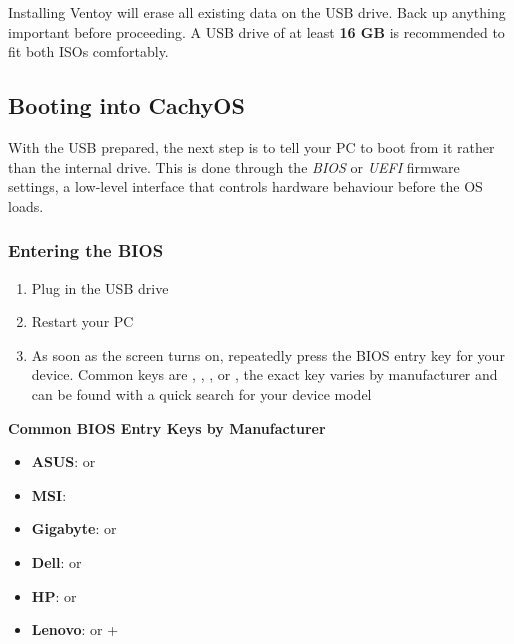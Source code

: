 \documentclass{article}
\begin{document}
\begin{tcolorbox}[arc=12pt, outer arc=10pt,
  colback=red!5!white, colframe=red!60!black,
  title=\textbf{Warning}]
  Installing Ventoy will erase all existing data on the USB drive. Back up anything important before proceeding. A USB drive of at least \textbf{16 GB} is recommended
  to fit both ISOs comfortably.
\end{tcolorbox}

\subsection{Booting into CachyOS}

With the USB prepared, the next step is to tell your PC to boot from it rather than the internal drive. This is done through the \textit{BIOS} or \textit{UEFI} firmware
settings, a low-level interface that controls hardware behaviour before the OS loads.

\subsubsection{Entering the BIOS}

\begin{enumerate}[leftmargin=1.5em, nosep, label={\arabic*.}]
  \item Plug in the USB drive
  \item Restart your PC
  \item As soon as the screen turns on, repeatedly press the BIOS entry key for your
    device. Common keys are , , , or , the exact key varies by manufacturer and can be found with a quick search for your device model
\end{enumerate}

\begin{callout}{\textbf{Common BIOS Entry Keys by Manufacturer}}
  \begin{itemize}[leftmargin=1.5em, nosep, label={\tiny\textbullet}]
    \item \textbf{ASUS}:  or 
    \item \textbf{MSI}: 
    \item \textbf{Gigabyte}:  or 
    \item \textbf{Dell}:  or 
    \item \textbf{HP}:  or 
    \item \textbf{Lenovo}:  or  + 
  \end{itemize}
\end{callout}
\end{document}
